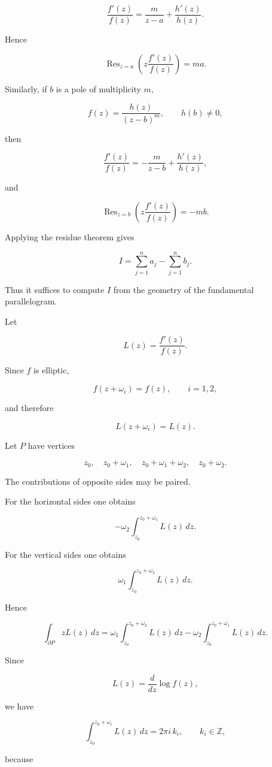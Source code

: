 \documentclass[12pt,a4paper]{article}
\theoremstyle{notespace}
\begin{document}
\[
\frac{f'(z)}{f(z)}
=
\frac{m}{z-a}
+\frac{h'(z)}{h(z)}.
\]

Hence

\[
\operatorname{Res}_{z=a}
\left(
z\frac{f'(z)}{f(z)}
\right)
=
ma.
\]

Similarly, if \(b\) is a pole of multiplicity \(m\),

\[
f(z)=\frac{h(z)}{(z-b)^m},
\qquad
h(b)\neq 0,
\]

then

\[
\frac{f'(z)}{f(z)}
=
-\frac{m}{z-b}
+\frac{h'(z)}{h(z)},
\]

and

\[
\operatorname{Res}_{z=b}
\left(
z\frac{f'(z)}{f(z)}
\right)
=
-mb.
\]

Applying the residue theorem gives

\[
I
=
\sum_{j=1}^{n}a_j
-
\sum_{j=1}^{n}b_j.
\]

Thus it suffices to compute \(I\) from the geometry of the fundamental parallelogram.

Let

\[
L(z)=\frac{f'(z)}{f(z)}.
\]

Since \(f\) is elliptic,

\[
f(z+\omega_i)=f(z),
\qquad i=1,2,
\]

and therefore

\[
L(z+\omega_i)=L(z).
\]

Let \(P\) have vertices

\[
z_0,\quad
z_0+\omega_1,\quad
z_0+\omega_1+\omega_2,\quad
z_0+\omega_2.
\]

The contributions of opposite sides may be paired.

For the horizontal sides one obtains

\[
-\omega_2
\int_{z_0}^{z_0+\omega_1}
L(z)\,dz.
\]

For the vertical sides one obtains

\[
\omega_1
\int_{z_0}^{z_0+\omega_2}
L(z)\,dz.
\]

Hence

\[
\int_{\partial P}
zL(z)\,dz
=
\omega_1
\int_{z_0}^{z_0+\omega_2}
L(z)\,dz
-
\omega_2
\int_{z_0}^{z_0+\omega_1}
L(z)\,dz.
\]

Since

\[
L(z)=\frac{d}{dz}\log f(z),
\]

we have

\[
\int_{z_0}^{z_0+\omega_i}
L(z)\,dz
=
2\pi i\,k_i,
\qquad
k_i\in\mathbb Z,
\]

because
\end{document}
